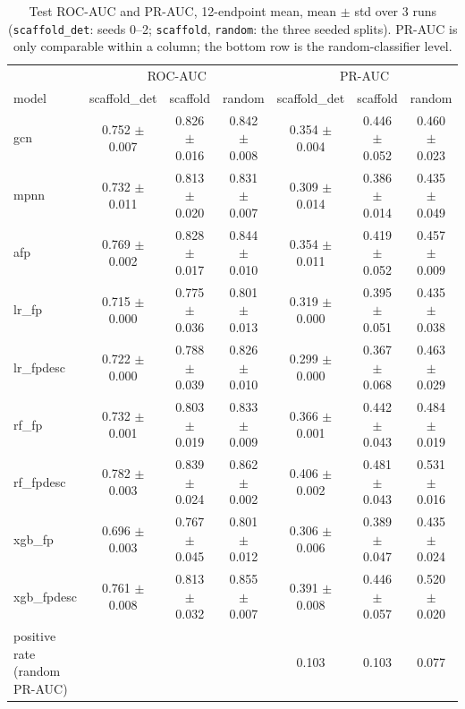 
\begin{table}[t]
\centering
\caption{Test ROC-AUC and PR-AUC, 12-endpoint mean, mean $\pm$ std over 3 runs (\texttt{scaffold\_det}: seeds 0--2; \texttt{scaffold}, \texttt{random}: the three seeded splits). PR-AUC is only comparable within a column; the bottom row is the random-classifier level.}
\label{tab:gnn-main}
\small
\begin{tabular}{lcccccc}
\toprule
 & \multicolumn{3}{c}{ROC-AUC} & \multicolumn{3}{c}{PR-AUC} \\
model & scaffold\_det & scaffold & random & scaffold\_det & scaffold & random \\
\midrule
gcn & 0.752 $\pm$ 0.007 & 0.826 $\pm$ 0.016 & 0.842 $\pm$ 0.008 & 0.354 $\pm$ 0.004 & 0.446 $\pm$ 0.052 & 0.460 $\pm$ 0.023 \\
mpnn & 0.732 $\pm$ 0.011 & 0.813 $\pm$ 0.020 & 0.831 $\pm$ 0.007 & 0.309 $\pm$ 0.014 & 0.386 $\pm$ 0.014 & 0.435 $\pm$ 0.049 \\
afp & 0.769 $\pm$ 0.002 & 0.828 $\pm$ 0.017 & 0.844 $\pm$ 0.010 & 0.354 $\pm$ 0.011 & 0.419 $\pm$ 0.052 & 0.457 $\pm$ 0.009 \\
lr\_fp & 0.715 $\pm$ 0.000 & 0.775 $\pm$ 0.036 & 0.801 $\pm$ 0.013 & 0.319 $\pm$ 0.000 & 0.395 $\pm$ 0.051 & 0.435 $\pm$ 0.038 \\
lr\_fpdesc & 0.722 $\pm$ 0.000 & 0.788 $\pm$ 0.039 & 0.826 $\pm$ 0.010 & 0.299 $\pm$ 0.000 & 0.367 $\pm$ 0.068 & 0.463 $\pm$ 0.029 \\
rf\_fp & 0.732 $\pm$ 0.001 & 0.803 $\pm$ 0.019 & 0.833 $\pm$ 0.009 & 0.366 $\pm$ 0.001 & 0.442 $\pm$ 0.043 & 0.484 $\pm$ 0.019 \\
rf\_fpdesc & 0.782 $\pm$ 0.003 & 0.839 $\pm$ 0.024 & 0.862 $\pm$ 0.002 & 0.406 $\pm$ 0.002 & 0.481 $\pm$ 0.043 & 0.531 $\pm$ 0.016 \\
xgb\_fp & 0.696 $\pm$ 0.003 & 0.767 $\pm$ 0.045 & 0.801 $\pm$ 0.012 & 0.306 $\pm$ 0.006 & 0.389 $\pm$ 0.047 & 0.435 $\pm$ 0.024 \\
xgb\_fpdesc & 0.761 $\pm$ 0.008 & 0.813 $\pm$ 0.032 & 0.855 $\pm$ 0.007 & 0.391 $\pm$ 0.008 & 0.446 $\pm$ 0.057 & 0.520 $\pm$ 0.020 \\
\midrule
positive rate (random PR-AUC) & \multicolumn{3}{c}{} & 0.103 & 0.103 & 0.077 \\
\bottomrule
\end{tabular}
\end{table}

